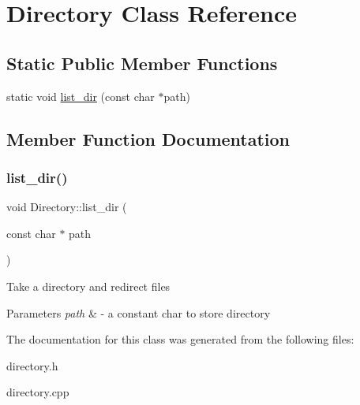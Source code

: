 \hypertarget{classDirectory}{}\section{Directory Class Reference}
\label{classDirectory}
\subsection*{Static Public Member Functions}
\begin{DoxyCompactItemize}
\item 
static void \hyperlink{classDirectory_aeb7ff3eedd5d9104f9236374eb04d66f}{list\+\_\+dir} (const char $\ast$path)
\end{DoxyCompactItemize}


\subsection{Member Function Documentation}
\mbox{\label{classDirectory_aeb7ff3eedd5d9104f9236374eb04d66f}} 
\subsubsection{\texorpdfstring{list\+\_\+dir()}{list\_dir()}}
{\footnotesize\ttfamily void Directory\+::list\+\_\+dir (\begin{DoxyParamCaption}\item[{const char $\ast$}]{path }\end{DoxyParamCaption})\hspace{0.3cm}{\ttfamily [static]}}

Take a directory and redirect files 
\begin{DoxyParams}{Parameters}
{\em path} & -\/ a constant char to store directory \\
\hline
\end{DoxyParams}


The documentation for this class was generated from the following files\+:\begin{DoxyCompactItemize}
\item 
directory.\+h\item 
directory.\+cpp\end{DoxyCompactItemize}
